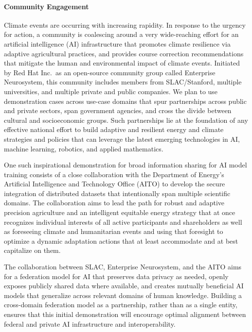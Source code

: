 
\paragraph{Community Engagement}
Climate events are occurring with increasing rapidity. 
In response to the urgency for action, a community is coalescing around a very wide-reaching effort for an artificial intelligence (AI) infrastructure that promotes climate resilience via adaptive agricultural practices, and provides course correction recommendations that mitigate the human and environmental impact of climate events.
Initiated by Red Hat Inc.~as an open-source community group called Enterprise Neurosystem, this community includes members from SLAC/Stanford, multiple universities, and multiple private and public companies.
We plan to use demonstration cases across use-case domains that spur partnerships across public and private sectors, span government agencies, and cross the divide between cultural and socioeconomic groups.
Such partnerships lie at the foundation of any effective national effort to build adaptive and resilient energy and climate strategies and policies \cite{SDGs} that can leverage the latest emerging technologies in AI, machine learning, robotics, and applied mathematics. 

One such inspirational demonstration for broad information sharing for AI model training consists of a close collaboration with the Department of Energy's Artificial Intelligence and Technology Office (AITO) to develop the secure integration of distributed datasets that intentionally span multiple scientific domains. 
The collaboration aims to lead the path for robust and adaptive precision agriculture and an intelligent equitable energy strategy that at once recognizes individual interests of all active participants and shareholders as well as foreseeing climate and humanitarian events and using that foresight to optimize a dynamic adaptation actions that at least accommodate and at best capitalize on them.

The collaboration between SLAC, Enterprise Neurosystem, and the AITO aims for a federation model for AI that preserves data privacy as needed, openly exposes publicly shared data where available, and creates mutually beneficial AI models that generalize across relevant domains of human knowledge.
Building a cross-domain federation model as a partnership, rather than as a single entity, ensures that this initial demonstration will encourage optimal alignment between federal and private AI infrastructure and interoperability.


